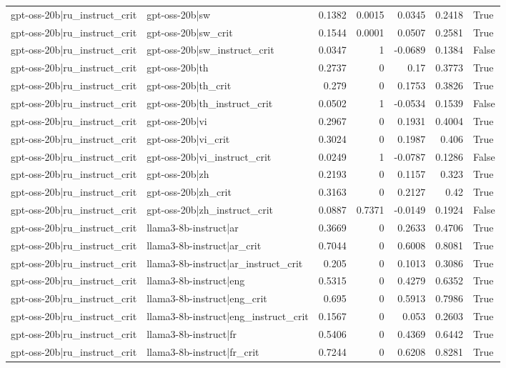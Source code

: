 \begin{table}
\begin{tabular}{l l r r r r l}
gpt-oss-20b|ru_instruct_crit & gpt-oss-20b|sw & 0.1382 & 0.0015 & 0.0345 & 0.2418 & True \\
gpt-oss-20b|ru_instruct_crit & gpt-oss-20b|sw_crit & 0.1544 & 0.0001 & 0.0507 & 0.2581 & True \\
gpt-oss-20b|ru_instruct_crit & gpt-oss-20b|sw_instruct_crit & 0.0347 & 1 & -0.0689 & 0.1384 & False \\
gpt-oss-20b|ru_instruct_crit & gpt-oss-20b|th & 0.2737 & 0 & 0.17 & 0.3773 & True \\
gpt-oss-20b|ru_instruct_crit & gpt-oss-20b|th_crit & 0.279 & 0 & 0.1753 & 0.3826 & True \\
gpt-oss-20b|ru_instruct_crit & gpt-oss-20b|th_instruct_crit & 0.0502 & 1 & -0.0534 & 0.1539 & False \\
gpt-oss-20b|ru_instruct_crit & gpt-oss-20b|vi & 0.2967 & 0 & 0.1931 & 0.4004 & True \\
gpt-oss-20b|ru_instruct_crit & gpt-oss-20b|vi_crit & 0.3024 & 0 & 0.1987 & 0.406 & True \\
gpt-oss-20b|ru_instruct_crit & gpt-oss-20b|vi_instruct_crit & 0.0249 & 1 & -0.0787 & 0.1286 & False \\
gpt-oss-20b|ru_instruct_crit & gpt-oss-20b|zh & 0.2193 & 0 & 0.1157 & 0.323 & True \\
gpt-oss-20b|ru_instruct_crit & gpt-oss-20b|zh_crit & 0.3163 & 0 & 0.2127 & 0.42 & True \\
gpt-oss-20b|ru_instruct_crit & gpt-oss-20b|zh_instruct_crit & 0.0887 & 0.7371 & -0.0149 & 0.1924 & False \\
gpt-oss-20b|ru_instruct_crit & llama3-8b-instruct|ar & 0.3669 & 0 & 0.2633 & 0.4706 & True \\
gpt-oss-20b|ru_instruct_crit & llama3-8b-instruct|ar_crit & 0.7044 & 0 & 0.6008 & 0.8081 & True \\
gpt-oss-20b|ru_instruct_crit & llama3-8b-instruct|ar_instruct_crit & 0.205 & 0 & 0.1013 & 0.3086 & True \\
gpt-oss-20b|ru_instruct_crit & llama3-8b-instruct|eng & 0.5315 & 0 & 0.4279 & 0.6352 & True \\
gpt-oss-20b|ru_instruct_crit & llama3-8b-instruct|eng_crit & 0.695 & 0 & 0.5913 & 0.7986 & True \\
gpt-oss-20b|ru_instruct_crit & llama3-8b-instruct|eng_instruct_crit & 0.1567 & 0 & 0.053 & 0.2603 & True \\
gpt-oss-20b|ru_instruct_crit & llama3-8b-instruct|fr & 0.5406 & 0 & 0.4369 & 0.6442 & True \\
gpt-oss-20b|ru_instruct_crit & llama3-8b-instruct|fr_crit & 0.7244 & 0 & 0.6208 & 0.8281 & True \\

\end{tabular}
\end{table}
